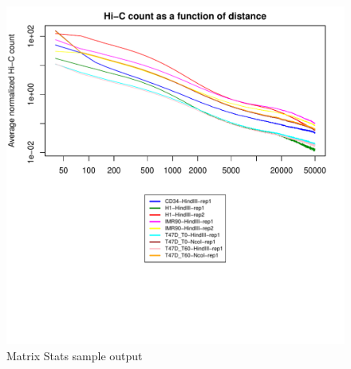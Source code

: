\begin{figure}[!htb]
    \centering
    \includegraphics[width=\textwidth,height=\textheight,keepaspectratio]{figure/matrix-stats_stats}
    \caption{Matrix Stats sample output} %
    \label{fig:matrix-stats}
\end{figure}
\clearpage